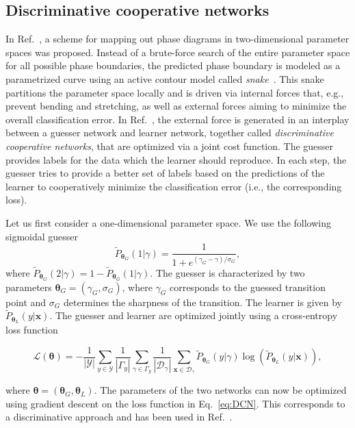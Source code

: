 \subsection{Discriminative cooperative networks}
\indent In Ref.~\cite{liu:2018}, a scheme for mapping out phase diagrams in two-dimensional parameter spaces was proposed. Instead of a brute-force search of the entire parameter space for all possible phase boundaries, the predicted phase boundary is modeled as a parametrized curve using an active contour model called \emph{snake}~\cite{kass:1988}. This snake partitions the parameter space locally and is driven via internal forces that, e.g., prevent bending and stretching, as well as external forces aiming to minimize the overall classification error. In Ref.~\cite{liu:2018}, the external force is generated in an interplay between a guesser network and learner network, together called \emph{discriminative cooperative networks}, that are optimized via a joint cost function. The guesser provides labels for the data which the learner should reproduce. In each step, the guesser tries to provide a better set of labels based on the predictions of the learner to cooperatively minimize the classification error (i.e., the corresponding loss).

\indent Let us first consider a one-dimensional parameter space. We use the following sigmoidal guesser
\begin{equation}
    \tilde{P}_{\bm{\theta}_{G}}(1|\gamma) = \frac{1}{1+e^{(\gamma_{G} - \gamma)/\sigma_{G}}},
\end{equation}
where $\tilde{P}_{\bm{\theta}_{G}}(2|\gamma) = 1 - \tilde{P}_{\bm{\theta}_{G}}(1|\gamma)$. The guesser is characterized by two parameters $\bm{\theta}_{G}=(\gamma_{G},\sigma_{G})$, where $\gamma_{G}$ corresponds to the guessed transition point and $\sigma_{G}$ determines the sharpness of the transition. The learner is given by $\tilde{P}_{\bm{\theta}_{L}}(y|\bm{x})$. The guesser and learner are optimized jointly using a cross-entropy loss function
\begin{widetext}
\begin{equation}\label{eq:DCN}
    \mathcal{L}(\bm{\theta}) = -  \frac{1}{|\mathcal{Y}|}\sum_{y \in \mathcal{Y}} \frac{1}{|\Gamma_{y}|}\sum_{\gamma \in \Gamma_{y}}\frac{1}{|\mathcal{D}_{\gamma}|}\sum_{\bm{x} \in \mathcal{D}_{\gamma}} \tilde{P}_{\bm{\theta}_{G}}(y|\gamma) \log\left(\tilde{P}_{\bm{\theta}_{L}}(y|\bm{x})\right),
\end{equation}
\end{widetext}
where $\bm{\theta} = \left( {\bm{\theta}_{G}}, {\bm{\theta}_{L}}\right)$. The parameters of the two networks can now be optimized using gradient descent on the loss function in Eq.~\eqref{eq:DCN}. This corresponds to a discriminative approach and has been used in Ref.~\cite{liu:2018}.

